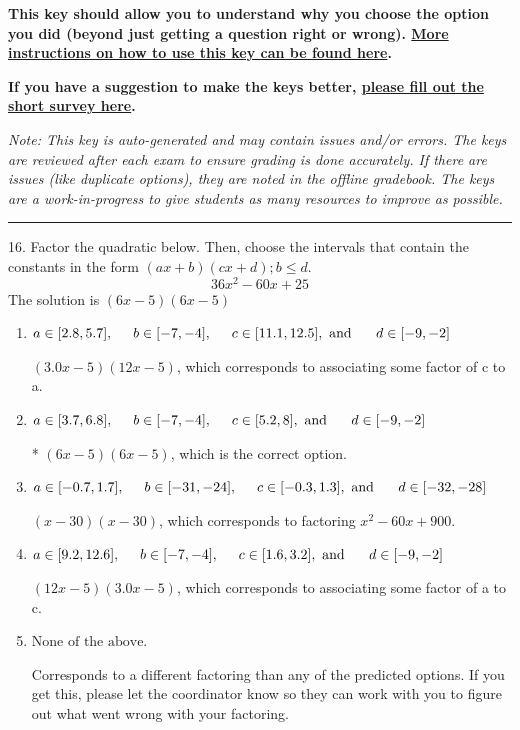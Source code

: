 \documentclass{article}[14pt]
\begin{document}
\textbf{This key should allow you to understand why you choose the option you did (beyond just getting a question right or wrong). \href{https://xronos.clas.ufl.edu/mac1105spring2020/courseDescriptionAndMisc/Exams/LearningFromResults}{More instructions on how to use this key can be found here}.}

\textbf{If you have a suggestion to make the keys better, \href{https://forms.gle/CZkbZmPbC9XALEE88}{please fill out the short survey here}.}

\textit{Note: This key is auto-generated and may contain issues and/or errors. The keys are reviewed after each exam to ensure grading is done accurately. If there are issues (like duplicate options), they are noted in the offline gradebook. The keys are a work-in-progress to give students as many resources to improve as possible.}

\rule{\textwidth}{0.4pt}

16. Factor the quadratic below. Then, choose the intervals that contain the constants in the form $(ax+b)(cx+d); b \leq d.$
$$ 36x^{2} -60 x + 25 $$ 
The solution is $ (6x -5)(6x -5) $ 

\begin{enumerate}[label=\Alph*.] 
\item $ a \in [2.8, 5.7], \hspace*{5mm} b \in [-7, -4], \hspace*{5mm} c \in [11.1, 12.5], \text{ and } \hspace*{5mm} d \in [-9, -2] $ 

  $(3.0x -5)(12x -5)$, which corresponds to associating some factor of c to a. 
\item $ a \in [3.7, 6.8], \hspace*{5mm} b \in [-7, -4], \hspace*{5mm} c \in [5.2, 8], \text{ and } \hspace*{5mm} d \in [-9, -2] $ 

 * $(6x -5)(6x -5)$, which is the correct option. 
\item $ a \in [-0.7, 1.7], \hspace*{5mm} b \in [-31, -24], \hspace*{5mm} c \in [-0.3, 1.3], \text{ and } \hspace*{5mm} d \in [-32, -28] $ 

  $(x -30)(x -30)$, which corresponds to factoring $x^{2} -60 x + 900$. 
\item $ a \in [9.2, 12.6], \hspace*{5mm} b \in [-7, -4], \hspace*{5mm} c \in [1.6, 3.2], \text{ and } \hspace*{5mm} d \in [-9, -2] $ 

  $(12x -5)(3.0x -5)$, which corresponds to associating some factor of a to c. 
\item $ \text{None of the above.} $ 

  Corresponds to a different factoring than any of the predicted options. If you get this, please let the coordinator know so they can work with you to figure out what went wrong with your factoring. 
\end{enumerate} 
 
\end{document}
